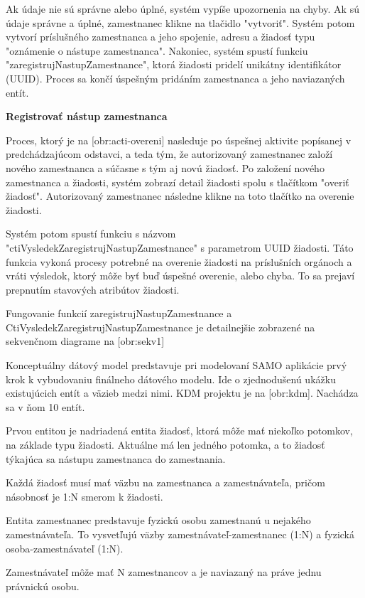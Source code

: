 Ak údaje nie sú správne alebo úplné, systém vypíše upozornenia na chyby. Ak sú údaje správne a úplné, zamestnanec klikne na tlačidlo "vytvoriť". Systém potom vytvorí príslušného zamestnanca a jeho spojenie, adresu a žiadosť typu "oznámenie o nástupe zamestnanca". Nakoniec, systém spustí funkciu "zaregistrujNastupZamestnance", ktorá žiadosti pridelí unikátny identifikátor (UUID). Proces sa končí úspešným pridáním zamestnanca a jeho naviazaných entít.

\blank
\start
\setupindenting[no]
\start\bf  Registrovať nástup zamestnanca\stop
\stop

Proces, ktorý je na [obr:acti-overeni] nasleduje po úspešnej aktivite popísanej v predchádzajúcom odstavci, a teda tým, že autorizovaný zamestnanec založí nového zamestnanca a súčasne s tým aj novú žiadosť. Po založení nového zamestnanca a žiadosti, systém zobrazí detail žiadosti spolu s tlačítkom "overiť žiadosť". Autorizovaný zamestnanec následne klikne na toto tlačítko na overenie žiadosti. 

Systém potom spustí funkciu s názvom "ctiVysledekZaregistrujNastupZamestnance" s parametrom UUID žiadosti. Táto funkcia vykoná procesy potrebné na overenie žiadosti na príslušních orgánoch a vráti výsledok, ktorý môže byť buď úspešné overenie, alebo chyba. To sa prejaví prepnutím stavových atribútov žiadosti. 

Fungovanie funkcií zaregistrujNastupZamestnance a CtiVysledekZaregistrujNastupZamestnance je detailnejšie zobrazené na sekvenčnom diagrame na [obr:sekv1]


Konceptuálny dátový model predstavuje pri modelovaní SAMO aplikácie prvý krok k vybudovaniu finálneho dátového modelu. Ide o zjednodušenú ukážku existujúcich entít a väzieb medzi nimi. KDM projektu je na [obr:kdm]. Nachádza sa v ňom 10 entít.

Prvou entitou je nadriadená entita žiadosť, ktorá môže mať niekoľko potomkov, na základe typu žiadosti. Aktuálne má len jedného potomka, a to žiadosť týkajúca sa nástupu zamestnanca do zamestnania. 

Každá žiadosť musí mať väzbu na zamestnanca a zamestnávateľa, pričom násobnosť je 1:N smerom k žiadosti.

Entita zamestnanec predstavuje fyzickú osobu zamestnanú u nejakého zamestnávateľa. To vysvetľujú väzby zamestnávateľ-zamestnanec (1:N) a fyzická osoba-zamestnávateľ (1:N). 

Zamestnávateľ môže mať N zamestnancov a je naviazaný na práve jednu právnickú osobu. 

